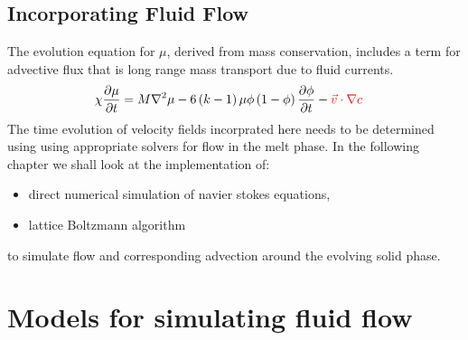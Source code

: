 \documentclass[12pt,a4paper]{report}
\begin{document}
\section{Incorporating Fluid Flow}
The evolution equation for $\mu$, derived from mass conservation, includes a term for advective flux that is long range mass transport due to fluid currents.
\begin{align}
\chi \dfrac{\partial \mu}{\partial t} &=  M\nabla^2\mu 
	- 6\left(k-1\right)\mu\phi\left(1-\phi\right)\dfrac{\partial\phi}{\partial t}- \color{red}{\vec{v}\cdot\nabla c}
\label{mu_evolution}
\end{align}
The time evolution of velocity fields incorprated here needs to be determined using using appropriate solvers for flow in the melt phase. In the following chapter we shall look at the implementation of: 
\begin{itemize}
	\item direct numerical simulation of navier stokes equations,
	\item lattice Boltzmann algorithm
\end{itemize}
to simulate flow and corresponding advection around the evolving solid phase.

\chapter{Models for simulating fluid flow}
\end{document}

